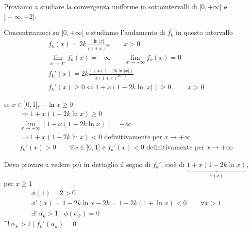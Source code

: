 \begin{exbar}
\begin{example}
	Proviamo a studiare la convergenza uniforme in sottointervalli di $]0,+\infty[$ e $]-\infty,-2[$.
	
	Concentriamoci su $]0,+\infty[$ e studiamo l'andamento di $f_k$ in questo intervallo
	\begin{gather*}
		f_k(x) = 2k \frac{\ln |x|}{(1+x)^{2k}} \qquad x >0
		\\
		\lim_{x \rightarrow 0^+} f_k(x) = -\infty \qquad \lim_{x \rightarrow +\infty} f_k(x) = 0
		\\
		f_k' (x) = 2k \frac{1+x(1-2k \ln |x|)}{x(1+x)^{2k+1}}
		\\
		f_k' (x) \geq 0 \iff 1+x(1-2k \ln |x|) \geq 0, \qquad x >0
	\end{gather*}

	se $x \in ]0,1]$, $-\ln x \geq 0$
	\begin{gather*}
		\Rightarrow 1+x(1-2k\ln x)\geq 0
		\\
		\lim_{x \rightarrow +\infty} [1+x(1-2k\ln x)]= -\infty
		\\
		\Rightarrow 1+x(1-2k\ln x)<0 \text{ definitivamente per } x \rightarrow +\infty
		\\
		f_k' (x) > 0 \qquad \forall x \in ]0,1] \text{ e } f_k' (x) < 0 \text{ definitivamente per } x \rightarrow +\infty
	\end{gather*} 
	
	\segnaposto %
	Devo provare a vedere più in dettaglio il segno di $f_k' $, cioè di $\underbrace{1+x(1-2k \ln x)}_{\phi(x)}$, per $x \geq 1$
	\begin{gather*}
		\phi(1) = 2 > 0
		\\
		\phi'(x)=1-2k\ln x -2k = 1-2k(1+\ln x)< 0 \qquad \forall x >1
		\\
		\exists! \ \alpha_k > 1 \; \big| \; \phi(\alpha_k) = 0
	\end{gather*}
	\segnaposto %
	$\exists! \ \alpha_k >1 \; \big| \; f_k' (\alpha_k)=0$
	

\end{example}
\end{exbar}
